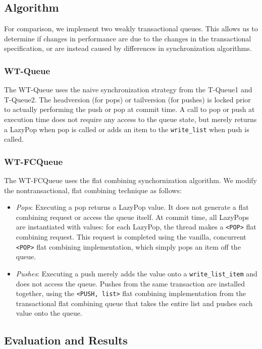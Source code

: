 \subsection{Algorithm}

For comparison, we implement two weakly transactional queues. This allows us to determine if changes in performance are due to the changes in the transactional specification, or are instead caused by differences in synchronization algorithms.

\subsubsection{WT-Queue}
The WT-Queue uses the naive synchronization strategy from the T-Queue1 and T-Queue2. The headversion (for pops) or tailversion (for pushes) is locked prior to actually performing the push or pop at commit time. A call to pop or push at execution time does not require any access to the queue state, but merely returns a LazyPop when pop is called or adds an item to the \texttt{write\_list} when push is called.

\subsubsection{WT-FCQueue}
The WT-FCQueue uses the flat combining synchornization algorithm. We modify the nontransactional, flat combining technique as follows:
\begin{itemize}
    \item \emph{Pops}: 
    Executing a pop returns a LazyPop value. It does not generate a flat combining request or access the queue itself. At commit time, all LazyPops are instantiated with values: for each LazyPop, the thread makes a \texttt{<POP>} flat combining request. This request is completed using the vanilla, concurrent \texttt{<POP>} flat combining implementation, which simply pops an item off the queue.

    \item \emph{Pushes}: 
    Executing a push merely adds the value onto a \texttt{write\_list\_item} and does not access the queue. Pushes from the same transaction are installed together, using the \texttt{<PUSH, list>} flat combining implementation from the transactional flat combining queue that takes the entire list and pushes each value onto the queue.
\end{itemize}

\subsection{Evaluation and Results}

